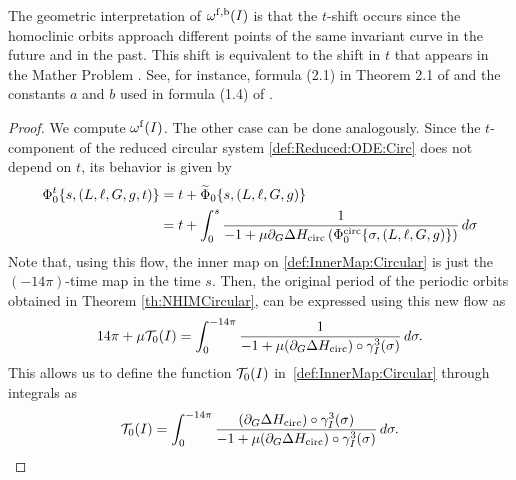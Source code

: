 The geometric interpretation of $\omega^{\mathrm{f},\mathrm{b}}(I)$ is that the $t$-shift
occurs since the homoclinic orbits approach different points of the
same invariant curve in the future and in the past. This shift is
equivalent to the shift in $t$ that appears in the Mather Problem
\cite{Mather96}. See, for instance, formula (2.1) in Theorem 2.1 of
\cite{DelshamsLS00} and the constants $a$ and $b$ used in formula
(1.4) of \cite{BolotinT99}.

\begin{proof}
We compute $\omega^{\mathrm{f}}(I)$. The other case can be done analogously.
  Since the $t$-component of the reduced circular system \eqref{def:Reduced:ODE:Circ} does not depend on $t$, its behavior is given by
  \begin{equation}\label{eq:Flow:Circ:Time}
    \begin{split}
      \Phi_0^t\{s,(L,\ell,G,g,t)\}&=t+\widetilde\Phi_0 \{s,(L,\ell,G,g)\}\\
      &=t+\int_0^s \frac{1}{-1+\mu\partial_G\Delta
        H_{\mathrm{circ}}\left(\Phi^{\mathrm{circ}}_0\{\sigma,(L,\ell,G,g)\}\right)} \,
      d\sigma
    \end{split}
  \end{equation}
  Note that, using this flow, the inner map on
  \eqref{def:InnerMap:Circular} is just the $(-14\pi)$-time map in the
  time $s$. Then, the original period of the periodic orbits obtained
  in Theorem \ref{th:NHIMCircular}, can be expressed using this new
  flow as
  \begin{equation}\label{eq:PeriodThroughIntegrals}
    14\pi+\mu\mathcal{T}_0(I)=\int_0^{-14\pi}\frac{1}{-1+\mu(\partial_G\Delta
      H_{\mathrm{circ}}) \circ \gamma^3_I(\sigma)} \, d\sigma.
  \end{equation}
  This allows us to define the function $\mathcal{T}_0(I)$
  in~\eqref{def:InnerMap:Circular} through integrals as
  \begin{equation}\label{def:T0:Integral}
    \mathcal{T}_0(I)=\int_0^{-14\pi} \frac{(\partial_G\Delta H_{\mathrm{circ}}) \circ
      \gamma^3_I(\sigma)}{-1+
      \mu (\partial_G\Delta H_{\mathrm{circ}}) \circ \gamma^3_I(\sigma)} \, d\sigma.
  \end{equation}


\end{proof}
